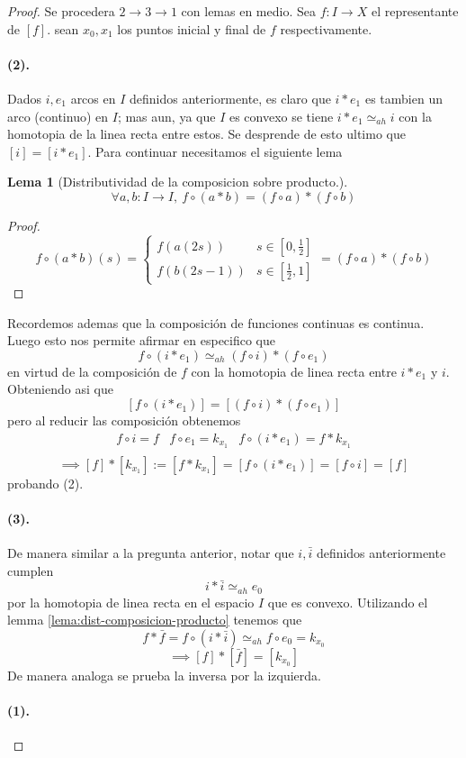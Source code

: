 \documentclass[letterpaper]{article}
\theoremstyle{definition}
\theoremstyle{plain}
\theoremstyle{plain}
\newtheorem{lema}{Lema}
\theoremstyle{remark}
\begin{document}
\begin{proof}
Se procedera \(2 \to 3 \to 1\) con lemas en medio. Sea \(f : I \to X\) el
representante de \([f]\). sean \(x_0, x_1\) los puntos inicial y final de
\(f\) respectivamente.

\paragraph{(2).} Dados \(i,e_1\) arcos en \(I\) definidos anteriormente,
es claro que \(i * e_1\) es tambien un arco (continuo) en \(I\); mas aun,
ya que \(I\) es convexo se tiene \(i * e_1 \simeq_{ah} i\) con la
homotopia de la linea recta entre estos. Se desprende de esto ultimo que
\( [i] = [i * e_1]\). Para continuar necesitamos el siguiente lema
\begin{lema}[Distributividad de la composicion sobre producto.]
\label{lema:dist-composicion-producto}
\[\forall a,b : I \to I,\ f \circ (a * b) = (f \circ a) * (f \circ b) \]
\end{lema}
\begin{proof}
  \[ f \circ (a*b) (s) =
    \begin{cases}
      f (a(2s)) & s \in [0,\frac{1}{2}] \\
      f (b(2s - 1)) & s \in [\frac{1}{2} , 1]
    \end{cases}
    = (f \circ a) * (f \circ b)
  \]
\end{proof}
Recordemos ademas que la composición de funciones continuas es continua.
Luego esto nos permite afirmar en especifico que
\[ f \circ (i * e_1) \simeq_{ah} (f \circ i) * (f \circ e_1) \] en virtud
de la composición de \(f\) con la homotopia de linea recta entre \(i *
e_1 \) y \(i\). Obteniendo asi que
\[ [f \circ (i * e_1)] = [(f \circ i) * (f \circ e_1)] \] pero al reducir
las composición obtenemos
\[
  \begin{matrix}
    f \circ i = f & f \circ e_1 = k_{x_1} & f \circ (i * e_1) = f *
    k_{x_{1}} \\
  \end{matrix}
\]
\[ \implies [f] * [k_{x_1}] := [f * k_{x_1}] = [f \circ (i * e_1)] = [ f
  \circ i] = [f] \]
probando (2).

\paragraph{(3).} De manera similar a la pregunta anterior, notar que \(i,
\bar{i}\) definidos anteriormente cumplen
\[ i * \bar{i} \simeq_{ah} e_0 \]
por la homotopia de linea recta en el espacio \(I\) que es convexo.
Utilizando el lemma \eqref{lema:dist-composicion-producto} tenemos que
\[ f * \bar{f} = f \circ (i * \bar{i}) \simeq_{ah} f \circ e_0 =
  k_{x_0} \]
\[ \implies [f] * [\bar{f}] = [k_{x_0}] \]
De manera analoga se prueba la inversa por la izquierda.

\paragraph{(1).}
\end{proof}
\end{document}
